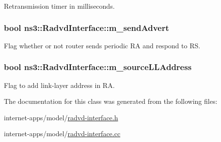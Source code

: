 Retransmission timer in milliseconds. 

\subsubsection[{\texorpdfstring{m\+\_\+send\+Advert}{m_sendAdvert}}]{\setlength{\rightskip}{0pt plus 5cm}bool ns3\+::\+Radvd\+Interface\+::m\+\_\+send\+Advert\hspace{0.3cm}{\ttfamily [private]}}\hypertarget{classns3_1_1RadvdInterface_a59d1c4bd832e86bbad853fed0c334bb4}{}\label{classns3_1_1RadvdInterface_a59d1c4bd832e86bbad853fed0c334bb4}


Flag whether or not router sends periodic RA and respond to RS. 

\subsubsection[{\texorpdfstring{m\+\_\+source\+L\+L\+Address}{m_sourceLLAddress}}]{\setlength{\rightskip}{0pt plus 5cm}bool ns3\+::\+Radvd\+Interface\+::m\+\_\+source\+L\+L\+Address\hspace{0.3cm}{\ttfamily [private]}}\hypertarget{classns3_1_1RadvdInterface_a56f94e906d5f7164011d25642f276366}{}\label{classns3_1_1RadvdInterface_a56f94e906d5f7164011d25642f276366}


Flag to add link-\/layer address in RA. 



The documentation for this class was generated from the following files\+:\begin{DoxyCompactItemize}
\item 
internet-\/apps/model/\hyperlink{radvd-interface_8h}{radvd-\/interface.\+h}\item 
internet-\/apps/model/\hyperlink{radvd-interface_8cc}{radvd-\/interface.\+cc}\end{DoxyCompactItemize}
